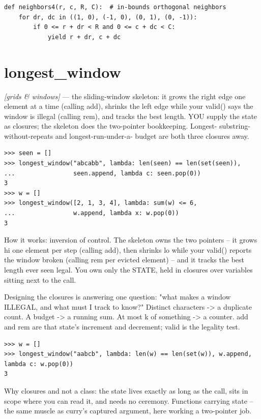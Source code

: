 \documentclass[11pt,letterpaper]{book}
\begin{document}
\begin{lstlisting}[style=code]
def neighbors4(r, c, R, C):  # in-bounds orthogonal neighbors
    for dr, dc in ((1, 0), (-1, 0), (0, 1), (0, -1)):
        if 0 <= r + dr < R and 0 <= c + dc < C:
            yield r + dr, c + dc
\end{lstlisting}

\section{longest\_window}
\noindent\textit{[grids \& windows]} --- the sliding-window skeleton: it grows the right edge one element at a time (calling add), shrinks the left edge while your valid() says the window is illegal (calling rem), and tracks the best length. YOU supply the state as closures; the skeleton does the two-pointer bookkeeping. Longest- substring-without-repeats and longest-run-under-a- budget are both three closures away.
\begin{lstlisting}[style=spec]
>>> seen = []
>>> longest_window("abcabb", lambda: len(seen) == len(set(seen)),
...                seen.append, lambda c: seen.pop(0))
3
>>> w = []
>>> longest_window([2, 1, 3, 4], lambda: sum(w) <= 6,
...                w.append, lambda x: w.pop(0))
3
\end{lstlisting}

How it works: inversion of control. The skeleton owns the two pointers -- it grows hi one element per step (calling add), then shrinks lo while your valid() reports the window broken (calling rem per evicted element) -- and it tracks the best length ever seen legal. You own only the STATE, held in closures over variables sitting next to the call.


Designing the closures is answering one question: "what makes a window ILLEGAL, and what must I track to know?" Distinct characters -> a duplicate count. A budget -> a running sum. At most k of something -> a counter. add and rem are that state's increment and decrement; valid is the legality test.

\begin{lstlisting}[style=spec]
>>> w = []
>>> longest_window("aabcb", lambda: len(w) == len(set(w)), w.append, lambda c: w.pop(0))
3
\end{lstlisting}

Why closures and not a class: the state lives exactly as long as the call, sits in scope where you can read it, and needs no ceremony. Functions carrying state -- the same muscle as curry's captured argument, here working a two-pointer job.
\end{document}
